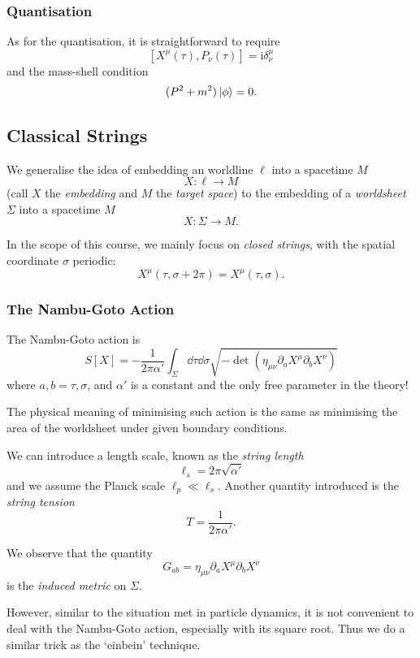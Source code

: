 \documentclass[a4paper,11pt]{article}
\begin{document}
	\subsubsection{Quantisation}

	As for the quantisation, it is straightforward to require 
	\[
		[X^\mu(\tau), P_\nu (\tau)] = \mathrm{i} \delta^\mu_\nu
	\]
	and the mass-shell condition
	\[
		(P^2 + m^2) \ket{\phi} = 0.
	\]
	
	\subsection{Classical Strings}

	We generalise the idea of embedding an worldline $\ell$ into a spacetime $M$
	\[
		X : \ell \to M
	\]
	(call $X$ the \emph{embedding} and $M$ the \emph{target space}) to the embedding of a \emph{worldsheet}	$\Sigma$ into a spacetime $M$
	\[
		X : \Sigma \to M.
	\]
	

	In the scope of this course, we mainly focus on \emph{closed strings}, with the spatial coordinate $\sigma$ periodic:
	\[
		X^\mu (\tau, \sigma + 2 \pi) = X^\mu (\tau,\sigma).
	\]
	
	\subsubsection{The Nambu-Goto Action}

	The Nambu-Goto action is 
	\[
		S[X] = - \frac{1}{2 \pi \alpha'}\int _{\Sigma} \dd{\tau} \dd{\sigma} \sqrt{ - \det \left( \eta _{\mu \nu} \partial_a X^\mu \partial_b X^\nu \right)}
	\]
	where $a,b = \tau,\sigma$, and $\alpha'$ is a constant and the only free parameter in the theory!

	The physical meaning of minimising such action is the same as minimising the area of the worldsheet under given boundary conditions.

	We can introduce a length scale, known as the \emph{string length}
	\[
		\ell_s = 2 \pi \sqrt{\alpha'}
	\]
	and we assume the Planck scale $\ell_p \ll \ell_s$. Another quantity introduced is the \emph{string tension}
	\[
		T = \frac{1}{2 \pi \alpha'}.
	\]
	
	We observe that the quantity
	\[
		G _{ab} = \eta _{\mu \nu} \partial_a X^\mu \partial_b X^\nu
	\]
	is the \emph{induced metric} on $\Sigma$.

	However, similar to the situation met in particle dynamics, it is not convenient to deal with the Nambu-Goto action, especially with its square root. Thus we do a similar trick as the `einbein' technique.
\end{document}
